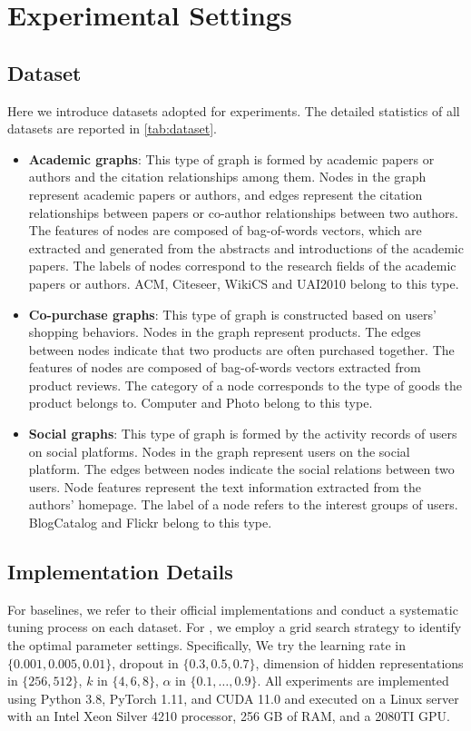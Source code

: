 \section{Experimental Settings}

\subsection{Dataset}\label{app:data}
Here we introduce datasets adopted for experiments. The detailed statistics of all datasets are reported in \autoref{tab:dataset}.
\begin{itemize}
    \item \textbf{Academic graphs}: This type of graph is formed by academic papers or authors and the citation relationships among them. Nodes in the graph represent academic papers or authors, and edges represent the citation relationships between papers or co-author relationships between two authors. The features of nodes are composed of bag-of-words vectors, which are extracted and generated from the abstracts and introductions of the academic papers. The labels of nodes correspond to the research fields of the academic papers or authors. ACM, Citeseer, WikiCS and UAI2010 belong to this type.
    \item \textbf{Co-purchase graphs}: This type of graph is constructed based on users' shopping behaviors. Nodes in the graph represent products. The edges between nodes indicate that two products are often purchased together. The features of nodes are composed of bag-of-words vectors extracted from product reviews. The category of a node corresponds to the type of goods the product belongs to. Computer and Photo belong to this type.

    \item \textbf{Social graphs}: This type of graph is formed by the activity records of users on social platforms. Nodes in the graph represent users on the social platform. The edges between nodes indicate the social relations between two users. Node features represent the text information extracted from the authors' homepage. The label of a node refers to the interest groups of users. BlogCatalog and Flickr belong to this type.
    
\end{itemize}


\subsection{Implementation Details}\label{app:imple}
For baselines, we refer to their official implementations and conduct a systematic tuning process on each dataset.
For \name, we employ a grid search strategy to identify the optimal parameter settings.
Specifically, We try the learning rate in $\{0.001, 0.005, 0.01\}$, dropout in $\{0.3, 0.5, 0.7\}$, dimension of hidden representations in $\{256, 512\}$,
$k$ in $\{4, 6, 8\}$, $\alpha$ in $\{0.1, \dots, 0.9\}$.
All experiments are implemented using Python 3.8, PyTorch 1.11, and CUDA 11.0 and executed on a Linux server with an Intel Xeon Silver 4210 processor, 256 GB of RAM, and a 2080TI GPU.


